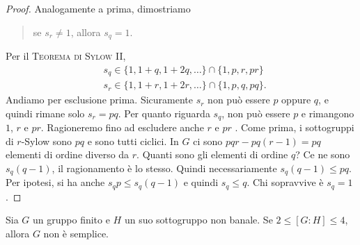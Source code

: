 \begin{proof}
Analogamente a prima, dimostriamo
\begin{quotation}
se $s_r \ne 1$, allora $s_q = 1$.
\end{quotation}
Per il {\scshape Teorema di Sylow II}, 
\[\begin{aligned}
& s_q \in \{1, 1+q, 1+2q, \dots{}\} \cap \{1, p, r, pr\} \\
& s_r \in \{1, 1+r, 1+2r, \dots{}\} \cap \{1, p, q, pq\} .
\end{aligned}\]
Andiamo per esclusione prima.
Sicuramente $s_r$ non può essere $p$ oppure $q$, e quindi rimane solo $s_r = pq$. Per quanto riguarda $s_q$, non può essere $p$ e rimangono $1$, $r$ e $pr$. Ragioneremo fino ad escludere anche $r$ e $pr$ . Come prima, i sottogruppi di $r$-Sylow sono $pq$ e sono tutti ciclici. In $G$ ci sono $pqr - pq(r-1) = pq$ elementi di ordine diverso da $r$. Quanti sono gli elementi di ordine $q$? Ce ne sono $s_q (q-1)$, il ragionamento è lo stesso. Quindi necessariamente $s_q(q-1) \le pq$. Per ipotesi, si ha anche $s_qp \le s_q(q-1)$ e quindi $s_q \le q$. Chi sopravvive è $s_q = 1$.
\end{proof}


\begin{prop}\label{prop:IndiceTra2e4}
Sia $G$ un gruppo finito e $H$ un suo sottogruppo non banale. Se $2\le[G:H]\le4$, allora $G$ non è semplice.
\end{prop}

